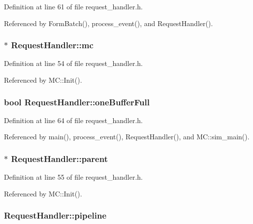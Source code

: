 Definition at line 61 of file request\_\-handler.h.

Referenced by FormBatch(), process\_\-event(), and RequestHandler().
\subsubsection[{mc}]{$\ast$ {\bf RequestHandler::mc}}\label{classRequestHandler_5e03befd33a2704212d01cc030666ce3}




Definition at line 54 of file request\_\-handler.h.

Referenced by MC::Init().
\subsubsection[{oneBufferFull}]{\setlength{\rightskip}{0pt plus 5cm}bool {\bf RequestHandler::oneBufferFull}}\label{classRequestHandler_8d97d715ba10ab051886b1b5a5b56d68}




Definition at line 64 of file request\_\-handler.h.

Referenced by main(), process\_\-event(), RequestHandler(), and MC::sim\_\-main().
\subsubsection[{parent}]{$\ast$ {\bf RequestHandler::parent}}\label{classRequestHandler_d0c3f57518617d211524ebe7d4da51ef}




Definition at line 55 of file request\_\-handler.h.

Referenced by MC::Init().
\subsubsection[{pipeline}]{ {\bf RequestHandler::pipeline}}\label{classRequestHandler_dc25794d3e70e92d98d0f424a46cd861}




